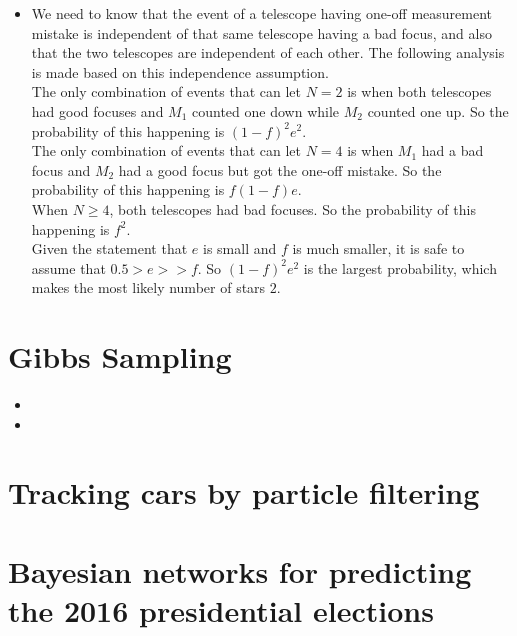 \documentclass[11pt]{article}
\begin{document}
\begin{onehalfspace}
\begin{itemize}
	\item
	We need to know that the event of a telescope having one-off measurement mistake is independent of that same telescope having a bad focus, and also that the two telescopes are independent of each other. The following analysis is made based on this independence assumption.\\
	The only combination of events that can let $N=2$ is when both telescopes had good focuses and $M_1$ counted one down while $M_2$ counted one up. So the probability of this happening is $(1-f)^2e^2$.\\
	The only combination of events that can let $N=4$ is when $M_1$ had a bad focus and $M_2$ had a good focus but got the one-off mistake. So the probability of this happening is $f(1-f)e$.\\
	When $N \geq 4$, both telescopes had bad focuses. So the probability of this happening is $f^2$.\\
	Given the statement that $e$ is small and $f$ is much smaller, it is safe to assume that $0.5 > e >> f$. So $(1-f)^2e^2$ is the largest probability, which makes the most likely number of stars $2$.
\end{itemize}
\section{Gibbs Sampling}
\begin{itemize}
	\item
	
	\item
\end{itemize}
\section{Tracking cars by particle filtering}
\section{Bayesian networks for predicting the 2016 presidential elections}
\end{onehalfspace}
\end{document}
